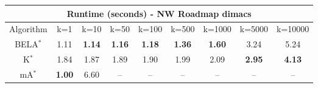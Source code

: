 \begin{tabular}{c|cccccccc}\toprule
\multicolumn{9}{c}{Runtime (seconds) - NW Roadmap dimacs}\\ \midrule
Algorithm & k=1 & k=10 & k=50 & k=100 & k=500 & k=1000 & k=5000 & k=10000 \\ \midrule
BELA$^*$ & 1.11 & \textbf{1.14} & \textbf{1.16} & \textbf{1.18} & \textbf{1.36} & \textbf{1.60} & 3.24 & 5.24 \\
K$^*$ & 1.84 & 1.87 & 1.89 & 1.90 & 1.99 & 2.09 & \textbf{2.95} & \textbf{4.13} \\
mA$^*$ & \textbf{1.00} & 6.60 & -- & -- & -- & -- & -- & -- \\ \bottomrule 
\end{tabular}
